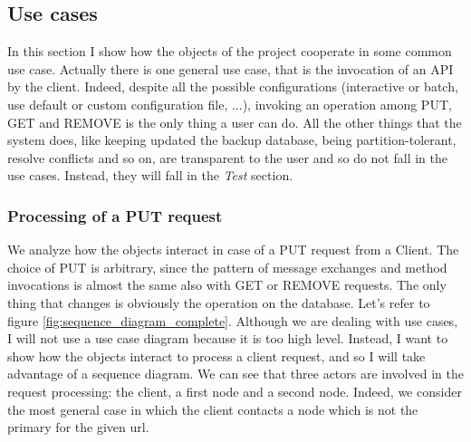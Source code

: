 \documentclass{article}
\begin{document}
\subsection{Use cases} 
In this section I show how the objects of the project cooperate in some common use case. Actually there is one general use case, that is the invocation of an API by the client. Indeed, despite all the possible configurations (interactive or batch, use default or custom configuration file, ...), invoking an operation among PUT, GET and REMOVE is the only thing a user can do. All the other things that the system does, like keeping updated the backup database, being partition-tolerant, resolve conflicts and so on, are transparent to the user and so do not fall in the use cases. Instead, they will fall in the \textit{Test} section.

\subsubsection{Processing of a PUT request} 
We analyze how the objects interact in case of a PUT request from a Client. The choice of PUT is arbitrary, since the pattern of message exchanges and method invocations is almost the same also with GET or REMOVE requests. The only thing that changes is obviously the operation on the database.
Let's refer to figure \ref{fig:sequence_diagram_complete}. Although we are dealing with use cases, I will not use a use case diagram because it is too high level. Instead, I want to show how the objects interact to process a client request, and so I will take advantage of a sequence diagram. We can see that three actors are involved in the request processing: the client, a first node and a second node. Indeed, we consider the most general case in which the client contacts a node which is not the primary for the given url.
\end{document}
